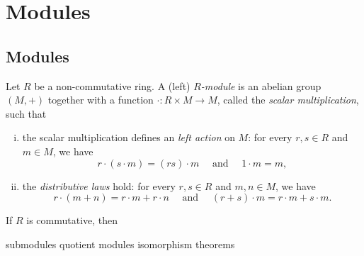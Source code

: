 \documentclass{../../large}
\begin{document}
\chapter{Modules}
\section{Modules}

\begin{prb}
Let $R$ be a non-commutative ring.
A (left) \emph{$R$-module} is an abelian group $(M,+)$ together with a function $\cdot:R\times M\to M$, called the \emph{scalar multiplication}, such that
\begin{enumerate}[(i)]
\item the scalar multiplication defines an \emph{left action} on $M$: for every $r,s\in R$ and $m\in M$, we have
\[r\cdot(s\cdot m)=(rs)\cdot m\quad\text{ and }\quad1\cdot m=m,\]
\item the \emph{distributive laws} hold: for every $r,s\in R$ and $m,n\in M$, we have
\[r\cdot (m+n)=r\cdot m+r\cdot n\quad\text{ and }\quad(r+s)\cdot m=r\cdot m+s\cdot m.\]
\end{enumerate}
\begin{parts}
\item If $R$ is commutative, then
\end{parts}
\end{prb}

submodules
quotient modules
isomorphism theorems
\end{document}
